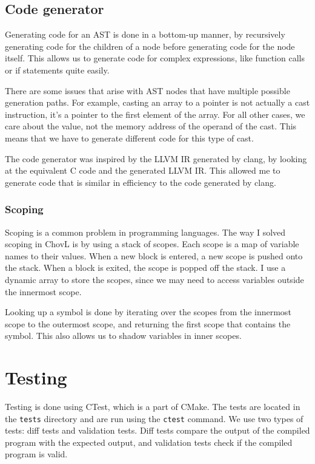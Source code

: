 \subsection{Code generator}
Generating code for an AST is done in a bottom-up manner, by recursively generating code for the children of a node before generating code for the node itself. This allows us to generate code for complex expressions, like function calls or if statements quite easily.

There are some issues that arise with AST nodes that have multiple possible generation paths. For example, casting an array to a pointer is not actually a cast instruction, it's a pointer to the first element of the array. For all other cases, we care about the value, not the memory address of the operand of the cast. This means that we have to generate different code for this type of cast.

The code generator was inspired by the LLVM IR generated by clang, by looking at the equivalent C code and the generated LLVM IR. This allowed me to generate code that is similar in efficiency to the code generated by clang.

\subsubsection{Scoping}
Scoping is a common problem in programming languages. The way I solved scoping in ChovL is by using a stack of scopes. Each scope is a map of variable names to their values. When a new block is entered, a new scope is pushed onto the stack. When a block is exited, the scope is popped off the stack. I use a dynamic array to store the scopes, since we may need to access variables outside the innermost scope.

Looking up a symbol is done by iterating over the scopes from the innermost scope to the outermost scope, and returning the first scope that contains the symbol. This also allows us to shadow variables in inner scopes.

\section{Testing}
Testing is done using CTest, which is a part of CMake. The tests are located in the \texttt{tests} directory and are run using the \texttt{ctest} command. We use two types of tests: diff tests and validation tests. Diff tests compare the output of the compiled program with the expected output, and validation tests check if the compiled program is valid.

